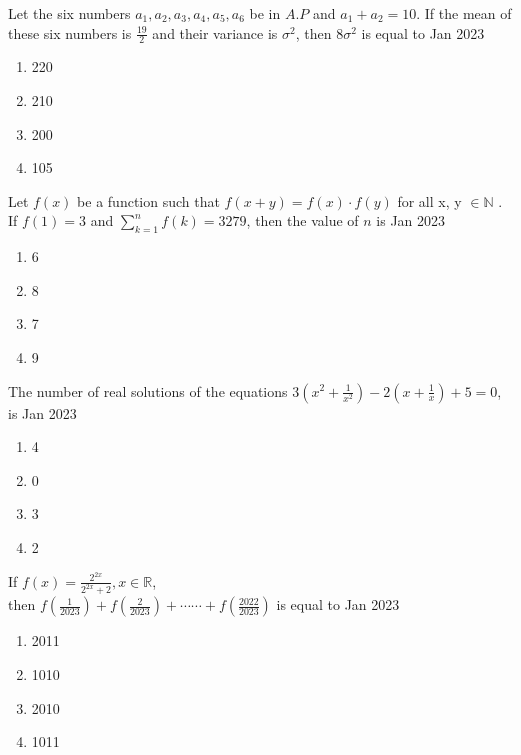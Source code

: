\iffalse
\title{assignment}
\author{EE24BTECH11016}
\section{mcq-single}
\fi



    \item Let the six numbers $a_{1},a_{2},a_{3},a_{4},a_{5},a_{6}$ be in $A.P$ and $a_{1}+a_{2}=10$. If the mean of these six numbers is $ \frac{19}{2} $ and their variance is $\sigma^{2}$, then 8$\sigma^{2}$ is equal to 
    \hfill{Jan 2023}\begin{enumerate}
        \item 220
        \item 210
        \item 200
        \item 105
    \end{enumerate}
    \item Let $f(x)$ be a function such that $f(x+y)=f(x)\cdot f(y)$ for all x, y $\in \mathbb{N}$ . If  $ f(1)=3 $  and  $ \sum_{k=1}^{n} f(k)= 3279$, then the value of $n$ is
    \hfill{Jan 2023}\begin{enumerate}
        \item 6
        \item 8
        \item 7
        \item 9
    \end{enumerate} 
    \item The number of real solutions of the equations $3\left( x^{2}+\frac{1}{x^{2}} \right)-2\left( x+\frac{1}{x} \right)+5=0$, is
    \hfill{Jan 2023}\begin{enumerate}
        
    \item 4
    \item 0
    \item 3
    \item 2
    \end{enumerate}
    \item If $f(x)=\frac{2^{2x}}{2^{2x}+2}, x \in \mathbb{R}$, \\
    then $f\left( \frac{1}{2023} \right)+f\left( \frac{2}{2023} \right)+\cdots\cdots+f\left( \frac{2022}{2023} \right)$ is equal to
    \hfill{Jan 2023}\begin{enumerate}
        \item 2011
        \item 1010
        \item 2010
        \item 1011
    \end{enumerate}
